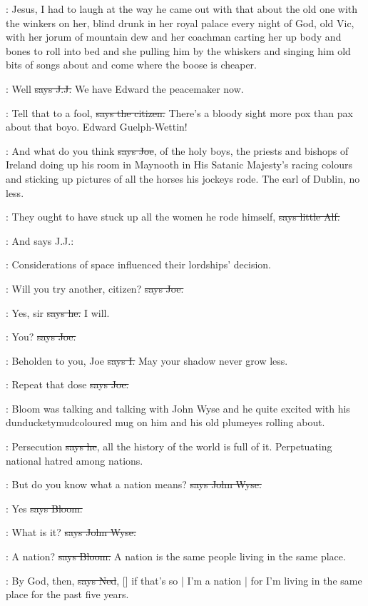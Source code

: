 \Nq:
Jesus,
I had to laugh at the way he came out with that
about the old one with the winkers on her,
blind drunk in her royal palace every night of God,
old Vic,
with her jorum of mountain dew
and her coachman carting her up
body and bones
to roll into bed
and she pulling him by the whiskers
and singing him old bits of songs about 
and come where the boose is cheaper.

\jjom:
Well
\sout{says J.J.}
We have Edward the peacemaker now.

\citizen:
Tell that to a fool,
\sout{says the citizen.}
There's a bloody sight more pox than pax about that boyo.
Edward Guelph-Wettin!

\joe:
And what do you think
\sout{says Joe},
of the holy boys,
the priests and bishops of Ireland doing up his room in Maynooth
in His Satanic Majesty's racing colours
and sticking up pictures of all the horses his jockeys rode.
The earl of Dublin,
no less.

\bergan:
They ought to have stuck up all the women he rode himself,
\sout{says little Alf.}

\Nq:
And says J.J.:

\jjom:
Considerations of space influenced their lordships' decision.

\joe:
Will you try another,
citizen?
\sout{says Joe.}

\citizen:
Yes,
sir
\sout{says he.}
I will.

\joe:
You?
\sout{says Joe.}

:
Beholden to you,
Joe
\sout{says I.}
May your shadow never grow less.

\joe:
Repeat that dose
\sout{says Joe.}

\Nq:
Bloom was talking and talking with John Wyse
and he quite excited with his dunducketymudcoloured mug on him
and his old plumeyes rolling about.

\Bloom:
Persecution
\sout{says he},
all the history of the world is full of it.
Perpetuating national hatred among nations.

\johnwyse:
But do you know what a nation means?
\sout{says John Wyse.}

\Bloom:
Yes
\sout{says Bloom.}

\johnwyse:
What is it?
\sout{says John Wyse.}

\Bloom:
A nation?
\sout{says Bloom.}
A nation is the same people living in the same place.

\lambert:
By God,
then,
\sout{says Ned},
[] if that's so |
I'm a nation |
for I'm living in the same place for the past five years.

